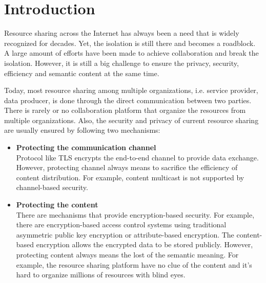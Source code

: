 \section{Introduction}

Resource sharing across the Internet has always been a need that is widely recognized for decades.
Yet, the isolation is still there and becomes a roadblock.
A large amount of efforts have been made to achieve collaboration and break the isolation.
However, it is still a big challenge to ensure the privacy, security, efficiency and semantic content at the same time.

Today, most resource sharing among multiple organizations, i.e. service provider, data producer, is done through the direct communication between two parties.
There is rarely or no collaboration platform that organize the resources from multiple organizations.
Also, the security and privacy of current resource sharing are usually ensured by following two mechanisms:
\begin{itemize}
\item \textbf{Protecting the communication channel} \\
Protocol like TLS encrypts the end-to-end channel to provide data exchange.
However, protecting channel always means to sacrifice the efficiency of content distribution.
For example, content multicast is not supported by channel-based security.
\item \textbf{Protecting the content} \\
There are mechanisms that provide encryption-based security.
For example, there are encryption-based access control systems using traditional asymmetric public key encryption or attribute-based encryption.
The content-based encryption allows the encrypted data to be stored publicly.
However, protecting content always means the lost of the semantic meaning.
For example, the resource sharing platform have no clue of the content and it's hard to organize millions of resources with blind eyes.
\end{itemize}
